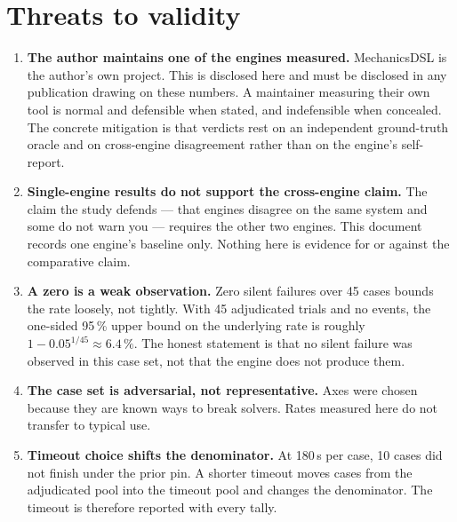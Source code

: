 \documentclass[11pt,a4paper]{article}
\begin{document}
\section{Threats to validity}\label{sec:threats}

\begin{enumerate}[leftmargin=1.6em,itemsep=0.4em]

  \item \textbf{The author maintains one of the engines measured.}
        MechanicsDSL is the author's own project. This is disclosed here and
        must be disclosed in any publication drawing on these numbers. A
        maintainer measuring their own tool is normal and defensible when
        stated, and indefensible when concealed. The concrete mitigation is
        that verdicts rest on an independent ground-truth oracle and on
        cross-engine disagreement rather than on the engine's self-report.

  \item \textbf{Single-engine results do not support the cross-engine claim.}
        The claim the study defends --- that engines disagree on the same
        system and some do not warn you --- requires the other two engines.
        This document records one engine's baseline only. Nothing here is
        evidence for or against the comparative claim.

  \item \textbf{A zero is a weak observation.} Zero silent failures over 45
        cases bounds the rate loosely, not tightly. With 45 adjudicated trials
        and no events, the one-sided 95\,\% upper bound on the underlying rate
        is roughly $1 - 0.05^{1/45} \approx 6.4\,\%$. The honest statement is
        that no silent failure was observed in this case set, not that the
        engine does not produce them.

  \item \textbf{The case set is adversarial, not representative.} Axes were
        chosen because they are known ways to break solvers. Rates measured
        here do not transfer to typical use.

  \item \textbf{Timeout choice shifts the denominator.} At 180\,s per case, 10
        cases did not finish under the prior pin. A shorter timeout moves cases
        from the adjudicated pool into the timeout pool and changes the
        denominator. The timeout is therefore reported with every tally.


\end{enumerate}
\end{document}
